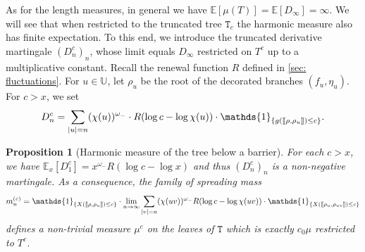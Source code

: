 \documentclass[12pt]{article}
\def\llbracket{[\hspace{-.10em} [ }
\def\rrbracket{ ] \hspace{-.10em}]}
\numberwithin{equation}{section}
\theoremstyle{plain}
\newtheorem{prop}[thm]{Proposition}
\theoremstyle{definition}
\begin{document}
As for the length measures, in general we have $\mathbb{E}[\mu(T)] = \mathbb{E}[D_{\infty}] = \infty$. We will see that when restricted to the truncated tree $\mathtt{T}_c$ the harmonic measure also has finite expectation. To this end, we introduce the truncated derivative martingale $(D^c_n)_n$, whose limit equals $D_{\infty}$ restricted on $T^c$ up to a multiplicative constant. Recall the renewal function $R$ defined in \cref{sec: fluctuations}.  For $u\in\mathbb{U}$, let $\rho_u$ be the root of the decorated branches $(f_u, \eta_u)$. For $c>x$, we set
\begin{equation}\label{eq: truncated derivative martingale}
D^c_n = \sum_{|u|=n} (\chi(u))^{\omega_-}\cdot  R(\log c-\log\chi(u))\cdot\mathds{1}_{\{g(\llbracket \rho, \rho_u \rrbracket)\leq c\}}.
\end{equation}

\begin{prop}[Harmonic measure of the tree below a barrier] \label{prop: derivative martingale}
For each $c>x$, we have $ \mathbb{E}_x\left[D^c_1\right] = x^{\omega_-}R(\log c-\log x)$ and thus $(D^c_n)_n$ is a non-negative martingale. As a consequence, the family of spreading mass
\begin{equation}\label{eq: spread mass critical truncated}
m_u^{(c)} = \mathds{1}_{\{X(\llbracket \rho, \rho_u \rrbracket)\leq c\}}\cdot\lim_{n\to\infty} \sum_{|v|=n} (\chi(uv))^{\omega_-} R(\log c-\log\chi(uv))\cdot\mathds{1}_{\{X(\llbracket \rho_u, \rho_{uv}\rrbracket)\leq c\}}
\end{equation}
defines a non-trivial measure $\mu^c$ on the leaves of $\mathtt{T}$ which is exactly $c_0 \mu$ restricted to $T^c$.
\end{prop}
\end{document}
